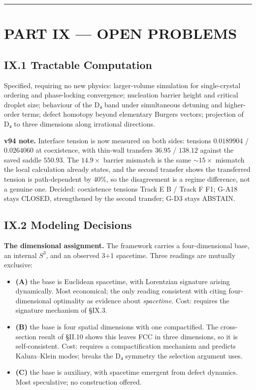\documentclass[a4paper,11pt]{article}
\begin{document}
\medskip\hrule\medskip

\section*{PART IX — OPEN PROBLEMS}

\subsection*{IX.1 Tractable Computation}

Specified, requiring no new physics: larger-volume simulation for single-crystal ordering and phase-locking convergence; nucleation barrier height and critical droplet size; behaviour of the D₄ band under simultaneous detuning and higher-order terms; defect homotopy beyond elementary Burgers vectors; projection of D₄ to three dimensions along irrational directions.

\textbf{v94 note.} Interface tension is now measured on both sides: tensions $0.0189904$ / $0.0264060$ at coexistence, with thin-wall transfers $36.95$ / $138.12$ against the saved saddle $550.93$. The $14.9\times$ barrier mismatch is the same $\sim15\times$ mismatch the local calculation already states, and the second transfer shows the transferred tension is path-dependent by 40\%, so the disagreement is a regime difference, not a genuine one. Decided: coexistence tensions Track E B / Track F F1; G-A18 stays CLOSED, strengthened by the second transfer; G-D3 stays ABSTAIN.

\subsection*{IX.2 Modeling Decisions}

\textbf{The dimensional assignment.} The framework carries a four-dimensional base, an internal $S^3$, and an observed 3+1 spacetime. Three readings are mutually exclusive:

\begin{itemize}
\item \textbf{(A)} the base is Euclidean spacetime, with Lorentzian signature arising dynamically. Most economical; the only reading consistent with citing four-dimensional optimality as evidence about \textit{spacetime}. Cost: requires the signature mechanism of §IX.3.
\item \textbf{(B)} the base is four spatial dimensions with one compactified. The cross-section result of §II.10 shows this leaves FCC in three dimensions, so it is self-consistent. Cost: requires a compactification mechanism and predicts Kaluza–Klein modes; breaks the D₄ symmetry the selection argument uses.
\item \textbf{(C)} the base is auxiliary, with spacetime emergent from defect dynamics. Most speculative; no construction offered.
\end{itemize}
\end{document}

